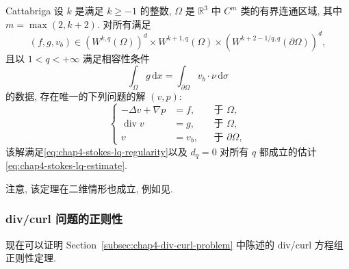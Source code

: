 \begin{Theorem}{Cattabriga}
\label{thm:chap4-stokes-cattabriga}
设 $k$ 是满足 $k\geq-1$ 的整数, $\Omega$ 是 $\mathbb R^3$ 中 $C^m$ 类的有界连通区域, 其中 $m=\max(2,k+2)$. 对所有满足
\[
 (f,g,v_b)\in(W^{k,q}(\Omega))^d\times W^{k+1,q}(\Omega)
 \times(W^{k+2-1/q,q}(\partial\Omega))^d,
\]
且以 $1<q<+\infty$ 满足相容性条件
\[
 \int_\Omega g\,\mathrm dx=\int_{\partial\Omega}v_b\cdot\nu\,\mathrm d\sigma
\]
的数据, 存在唯一的下列问题的解 $(v,p)$:
\[
 \left\{
 \begin{aligned}
  -\Delta v+\nabla p&=f,&&\text{于 }\Omega,\\
  \operatorname{div}v&=g,&&\text{于 }\Omega,\\
  v&=v_b,&&\text{于 }\partial\Omega,
 \end{aligned}
 \right.
\]
该解满足\eqref{eq:chap4-stokes-lq-regularity}以及 $d_q=0$ 对所有 $q$ 都成立的估计\eqref{eq:chap4-stokes-lq-estimate}.
\end{Theorem}

注意, 该定理在二维情形也成立, 例如见.

\subsubsection{div/curl 问题的正则性}
\label{subsec:chap4-divcurl-regularity-proof}

现在可以证明 Section~\ref{subsec:chap4-div-curl-problem} 中陈述的 div/curl 方程组正则性定理.


